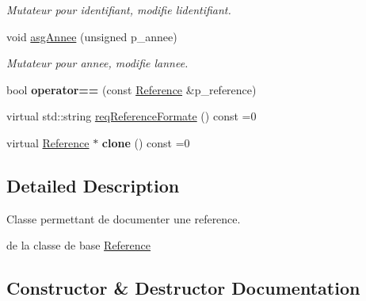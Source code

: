 \begin{DoxyCompactItemize}
\begin{DoxyCompactList}\small\item\em Mutateur pour identifiant, modifie l\textquotesingle{}identifiant. \end{DoxyCompactList}\item 
\hypertarget{classtp_1_1Reference_ab793e0c7d61b5972c2937152722f48cb}{}void \hyperlink{classtp_1_1Reference_ab793e0c7d61b5972c2937152722f48cb}{asg\+Annee} (unsigned p\+\_\+annee)\label{classtp_1_1Reference_ab793e0c7d61b5972c2937152722f48cb}

\begin{DoxyCompactList}\small\item\em Mutateur pour annee, modifie l\textquotesingle{}annee. \end{DoxyCompactList}\item 
\hypertarget{classtp_1_1Reference_ac2fc9e39760fb00287556c3fa6fed386}{}bool {\bfseries operator==} (const \hyperlink{classtp_1_1Reference}{Reference} \&p\+\_\+reference)\label{classtp_1_1Reference_ac2fc9e39760fb00287556c3fa6fed386}

\item 
virtual std\+::string \hyperlink{classtp_1_1Reference_af166101d908f6d0f8edeb8624aa77a9b}{req\+Reference\+Formate} () const =0
\item 
\hypertarget{classtp_1_1Reference_a01028cf0d5f94314ce00e38ccad96089}{}virtual \hyperlink{classtp_1_1Reference}{Reference} $\ast$ {\bfseries clone} () const =0\label{classtp_1_1Reference_a01028cf0d5f94314ce00e38ccad96089}

\end{DoxyCompactItemize}


\subsection{Detailed Description}
Classe permettant de documenter une reference. 

de la classe de base \hyperlink{classtp_1_1Reference}{Reference} 

\subsection{Constructor \& Destructor Documentation}
\hypertarget{classtp_1_1Reference_acea8bdd14988b8b699bc0fb78bca6302}{}
